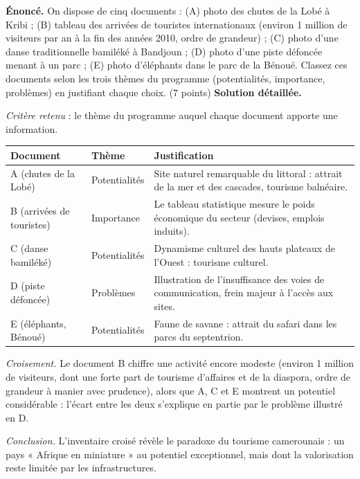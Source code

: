\documentclass[11pt]{article}
\begin{document}
\begin{exoresolu}
\textbf{Énoncé.} On dispose de cinq documents : (A) photo des chutes de la Lobé à Kribi ; (B) tableau des arrivées de touristes internationaux (environ 1 million de visiteurs par an à la fin des années 2010, ordre de grandeur) ; (C) photo d'une danse traditionnelle bamiléké à Bandjoun ; (D) photo d'une piste défoncée menant à un parc ; (E) photo d'éléphants dans le parc de la Bénoué. Classez ces documents selon les trois thèmes du programme (potentialités, importance, problèmes) en justifiant chaque choix. (7 points)
\tcblower
\textbf{Solution détaillée.}

\emph{Critère retenu} : le thème du programme auquel chaque document apporte une information.

\begin{center}
\begin{tabularx}{\linewidth}{|l|X|X|}
\hline
\rowcolor{popblueL} \textbf{Document} & \textbf{Thème} & \textbf{Justification} \\
\hline
A (chutes de la Lobé) & Potentialités & Site naturel remarquable du littoral : attrait de la mer et des cascades, tourisme balnéaire. \\
\hline
B (arrivées de touristes) & Importance & Le tableau statistique mesure le poids économique du secteur (devises, emplois induits). \\
\hline
C (danse bamiléké) & Potentialités & Dynamisme culturel des hauts plateaux de l'Ouest : tourisme culturel. \\
\hline
D (piste défoncée) & Problèmes & Illustration de l'insuffisance des voies de communication, frein majeur à l'accès aux sites. \\
\hline
E (éléphants, Bénoué) & Potentialités & Faune de savane : attrait du safari dans les parcs du septentrion. \\
\hline
\end{tabularx}
\end{center}

\emph{Croisement.} Le document B chiffre une activité encore modeste (environ 1 million de visiteurs, dont une forte part de tourisme d'affaires et de la diaspora, ordre de grandeur à manier avec prudence), alors que A, C et E montrent un potentiel considérable : l'écart entre les deux s'explique en partie par le problème illustré en D.

\emph{Conclusion.} L'inventaire croisé révèle le paradoxe du tourisme camerounais : un pays « Afrique en miniature » au potentiel exceptionnel, mais dont la valorisation reste limitée par les infrastructures.
\end{exoresolu}
\end{document}
